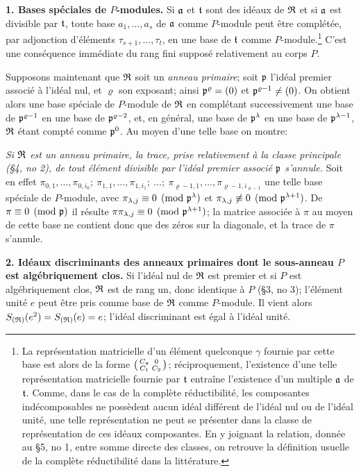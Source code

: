 \textbf{1. Bases spéciales de $P$-modules.} Si $\mathfrak a$ et $\mathfrak t$ sont des idéaux de $\mathfrak R$ et si $\mathfrak a$ est divisible par $\mathfrak t$, toute base $a_1,\ldots,a_s$ de $\mathfrak a$ comme $P$-module peut être complétée, par adjonction d'éléments $\tau_{s+1},\ldots,\tau_t$, en une base de $\mathfrak t$ comme $P$-module.\footnote{La représentation matricielle d'un élément quelconque $\gamma$ fournie par cette base est alors de la forme $\left(\begin{smallmatrix}C_\mathfrak a&0\\ C_1&C_2\end{smallmatrix}\right)$; réciproquement, l'existence d'une telle représentation matricielle fournie par $\mathfrak t$ entraîne l'existence d'un multiple $\mathfrak a$ de $\mathfrak t$. Comme, dans le cas de la complète réductibilité, les composantes indécomposables ne possèdent aucun idéal différent de l'idéal nul ou de l'idéal unité, une telle représentation ne peut se présenter dans la classe de représentation de ces idéaux composantes. En y joignant la relation, donnée au \S 5, no 1, entre somme directe des classes, on retrouve la définition usuelle de la complète réductibilité dans la littérature.} C'est une conséquence immédiate du rang fini supposé relativement au corps $P$.

Supposons maintenant que $\mathfrak R$ soit un \emph{anneau primaire}; soit $\mathfrak p$ l'idéal premier associé à l'idéal nul, et $\varrho$ son exposant; ainsi $\mathfrak p^{\varrho}=(0)$ et $\mathfrak p^{\varrho-1}\ne(0)$. On obtient alors une base spéciale de $P$-module de $\mathfrak R$ en complétant successivement une base de $\mathfrak p^{\varrho-1}$ en une base de $\mathfrak p^{\varrho-2}$, et, en général, une base de $\mathfrak p^\lambda$ en une base de $\mathfrak p^{\lambda-1}$, $\mathfrak R$ étant compté comme $\mathfrak p^0$. Au moyen d'une telle base on montre:

\emph{Si $\mathfrak R$ est un anneau primaire, la trace, prise relativement à la classe principale (\S 4, no 2), de tout élément divisible par l'idéal premier associé $\mathfrak p$ s'annule.} Soit en effet
$\pi_{0,1},\ldots,\pi_{0,i_0};\ \pi_{1,1},\ldots,\pi_{1,i_1};\ \ldots;\ \pi_{\varrho-1,1},\ldots,\pi_{\varrho-1,i_{\varrho-1}}$
une telle base spéciale de $P$-module, avec
$\pi_{\lambda,j}\equiv0\pmod{\mathfrak p^\lambda}$ et
$\pi_{\lambda,j}\not\equiv0\pmod{\mathfrak p^{\lambda+1}}$.
De $\pi\equiv0\pmod{\mathfrak p}$ il résulte
$\pi\pi_{\lambda,j}\equiv0\pmod{\mathfrak p^{\lambda+1}}$; la matrice associée à $\pi$ au moyen de cette base ne contient donc que des zéros sur la diagonale, et la trace de $\pi$ s'annule.

\textbf{2. Idéaux discriminants des anneaux primaires dont le sous-anneau $P$ est algébriquement clos.} Si l'idéal nul de $\mathfrak R$ est premier et si $P$ est algébriquement clos, $\mathfrak R$ est de rang un, donc identique à $P$ (\S 3, no 3); l'élément unité $e$ peut être pris comme base de $\mathfrak R$ comme $P$-module. Il vient alors $S_{(\mathfrak R)}(e^2)=S_{(\mathfrak R)}(e)=e$; l'idéal discriminant est égal à l'idéal unité.


